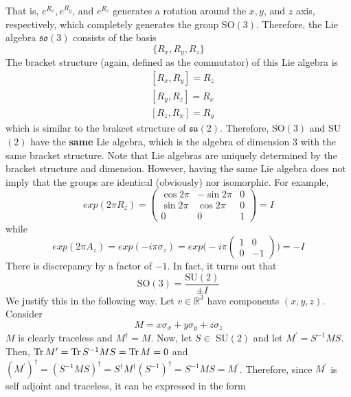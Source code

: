     That is, $e^{R_x}, e^{R_y}$, and $e^{R_z}$ generates a rotation around the $x, y$, and $z$ axis, respectively, which completely generates the group SO$(3)$. Therefore, the Lie algebra $\mathfrak{so}(3)$ consists of the basis 
    \begin{equation}
      \{R_x, R_y, R_z\}
    \end{equation}
    The bracket structure (again, defined as the commutator) of this Lie algebra is 
    \begin{align*}
      & [R_x, R_y] = R_z \\
      & [R_y, R_z] = R_x \\
      & [R_z, R_x] = R_y
    \end{align*}
    which is similar to the brakcet structure of $\mathfrak{su}(2)$. Therefore, SO$(3)$ and SU$(2)$ have the \textbf{same} Lie algebra, which is the algebra of dimension 3 with the same bracket structure. Note that Lie algebras are uniquely determined by the bracket structure and dimension. However, having the same Lie algebra does not imply that the groups are identical (obviously) nor isomorphic. For example, 
    \begin{equation}
      exp(2\pi R_z) = \begin{pmatrix}
      \cos{2\pi} & -\sin{2\pi} & 0 \\
      \sin{2\pi} & \cos{2\pi} & 0 \\
      0 & 0 & 1
      \end{pmatrix} = I
    \end{equation}
    while 
    \begin{equation}
      exp(2\pi A_z) = 
      exp(-i \pi \sigma_z) = exp \bigg(-i \pi \begin{pmatrix}
      1&0\\0&-1
      \end{pmatrix} \bigg) = -I
    \end{equation}
    There is discrepancy by a factor of $-1$. In fact, it turns out that
    \begin{equation}
      \text{SO}(3) = \frac{\text{SU}(2)}{\pm I}
    \end{equation}
    We justify this in the following way. Let $v \in \mathbb{R}^3$ have components $(x, y, z)$. Consider
    \begin{equation}
      M = x \sigma_x + y \sigma_y + z \sigma_z
    \end{equation}
    $M$ is clearly traceless and $M^\dagger = M$. Now, let $S \in$ SU$(2)$ and let $M^\prime = S^{-1} M S$. Then, $\operatorname{Tr}{M^\prime} = \operatorname{Tr}{S^{-1} M S} = \operatorname{Tr}{M} = 0$ and $(M^\prime)^\dagger = (S^{-1} M S)^\dagger = S^\dagger M^\dagger (S^{-1})^\dagger = S^{-1} M S = M^\prime$. Therefore, since $M^\prime$ is self adjoint and traceless, it can be expressed in the form

